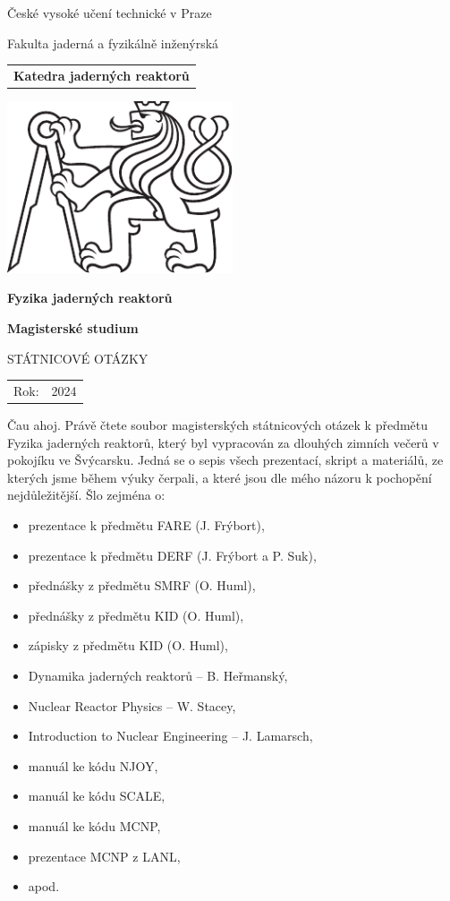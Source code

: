\documentclass[a4paper, 11pt]{article}
\newcommand{\logoCVUT}{\includegraphics[width = 0.5\textwidth]{img/symbol_cvut_konturova_verze_cb.pdf}}
\begin{document}
% 
% 

\thispagestyle{empty}

\begin{center}
	{\LARGE
		České vysoké učení technické v Praze \par
		Fakulta jaderná a fyzikálně inženýrská
	}
    \vspace{10mm}

    \begin{tabular}{c}
		\textbf{Katedra jaderných reaktorů} \\[3pt]
    \end{tabular}

   \vspace{10mm} \logoCVUT \vspace{15mm}

   {\huge \textbf{Fyzika jaderných reaktorů}\par}
   \vspace{5mm}
   {\huge \textbf{Magisterské studium}\par}

   \vspace{15mm}
   {\Large \MakeUppercase{Státnicové otázky}}

   \vfill
   {\large
    \begin{tabular}{ll}
    Rok: & 2024
    \end{tabular}
   }
\end{center}

\newpage
\thispagestyle{empty}

\vfill

\vspace{1em}
Čau ahoj. Právě čtete soubor magisterských státnicových otázek k předmětu Fyzika jaderných reaktorů, který byl vypracován za dlouhých zimních večerů v pokojíku ve Švýcarsku. Jedná se o sepis všech prezentací, skript a materiálů, ze kterých jsme během výuky čerpali, a které jsou dle mého názoru k pochopění nejdůležitější. Šlo zejména o:

\begin{itemize}
    \item prezentace k předmětu FARE (J. Frýbort),
    \item prezentace k předmětu DERF (J. Frýbort a P. Suk),
    \item přednášky z předmětu SMRF (O. Huml),
    \item přednášky z předmětu KID (O. Huml),
    \item zápisky z předmětu KID (O. Huml),
    \item Dynamika jaderných reaktorů -- B. Heřmanský,
    \item Nuclear Reactor Physics -- W. Stacey,
    \item Introduction to Nuclear Engineering -- J. Lamarsch,
    \item manuál ke kódu NJOY,
    \item manuál ke kódu SCALE,
    \item manuál ke kódu MCNP,
    \item prezentace MCNP z LANL,
    \item apod.
\end{itemize}
\end{document}
